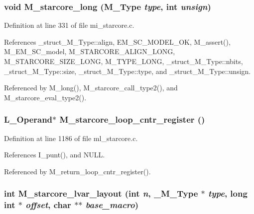 \subsubsection{\setlength{\rightskip}{0pt plus 5cm}void M\_\-starcore\_\-long (\bf{M\_\-Type} {\em type}, int {\em unsign})}\label{m__starcore_8h_2d859fb42b06bdd7488f042ef7da6844}




Definition at line 331 of file mi\_\-starcore.c.

References \_\-struct\_\-M\_\-Type::align, EM\_\-SC\_\-MODEL\_\-OK, M\_\-assert(), M\_\-EM\_\-SC\_\-model, M\_\-STARCORE\_\-ALIGN\_\-LONG, M\_\-STARCORE\_\-SIZE\_\-LONG, M\_\-TYPE\_\-LONG, \_\-struct\_\-M\_\-Type::nbits, \_\-struct\_\-M\_\-Type::size, \_\-struct\_\-M\_\-Type::type, and \_\-struct\_\-M\_\-Type::unsign.

Referenced by M\_\-long(), M\_\-starcore\_\-call\_\-type2(), and M\_\-starcore\_\-eval\_\-type2().
\subsubsection{\setlength{\rightskip}{0pt plus 5cm}L\_\-Operand$\ast$ M\_\-starcore\_\-loop\_\-cntr\_\-register ()}\label{m__starcore_8h_cfeadf7a357e658163e0c73dd9637f35}




Definition at line 1186 of file ml\_\-starcore.c.

References I\_\-punt(), and NULL.

Referenced by M\_\-return\_\-loop\_\-cntr\_\-register().
\subsubsection{\setlength{\rightskip}{0pt plus 5cm}int M\_\-starcore\_\-lvar\_\-layout (int {\em n}, \bf{\_\-M\_\-Type} $\ast$ {\em type}, long int $\ast$ {\em offset}, char $\ast$$\ast$ {\em base\_\-macro})}\label{m__starcore_8h_991e840b835c01147a32d63bb984c1c5}




